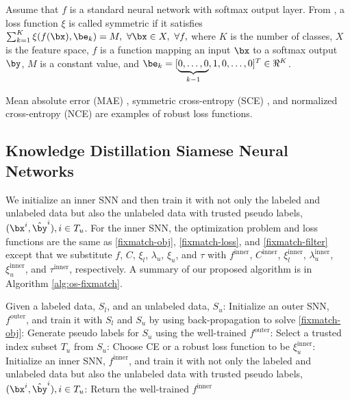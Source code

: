 \documentclass{article}
\begin{document}
Assume that $f$ is a standard neural network with softmax output layer.
From \cite{AG17a}, a loss function $\xi$ is called symmetric if it satisfies
$\sum_{k=1}^K \xi(f(\bx), \be_k) = M,\ \forall \bx \in X,\ \forall f,$
where $K$ is the number of classes, $X$ is the feature space, 
$f$ is a function mapping an input $\bx$ to a softmax output $\by$, $M$ is a constant value, and
$\be_k = [\underbrace{0, \ldots, 0}_{k-1}, 1, 0, \ldots, 0]^T \in \Re^K$.

Mean absolute error (MAE) \cite{CJW85a}, symmetric cross-entropy (SCE) \cite{YW19a}, and normalized cross-entropy (NCE) \cite{XM20a} are examples of robust loss functions.

\subsection{Knowledge Distillation Siamese Neural Networks}
\label{subsec:dual-TS}

We initialize an inner SNN and then train it with not only the labeled and unlabeled data but also the unlabeled data with trusted pseudo labels, $(\bx^i, \hat{\by}^i), i \in T_u$.
For the inner SNN, the optimization problem and loss functions are the same as \eqref{fixmatch-obj}, \eqref{fixmatch-loss}, and \eqref{fixmatch-filter} except that
we substitute $f$, $C$, $\xi_l$, $\lambda_u$, $\xi_u$, and $\tau$  with $f^{\text{inner}}$, $C^{\text{inner}}$, $\xi^{\text{inner}}_l$, $\lambda^{\text{inner}}_u$, $\xi^{\text{inner}}_u$, and $\tau^{\text{inner}}$, respectively.
A summary of our proposed algorithm is in Algorithm \ref{alg:os-fixmatch}.

\setcounter{algocf}{0}
\begin{algorithm}[t]
    Given a labeled data, $S_l$, and an unlabeled data, $S_u$: Initialize an outer SNN, $f^{\text{outer}}$, and train it with $S_l$ and $S_u$ by using back-propagation to
    solve \eqref{fixmatch-obj}: Generate pseudo labels for $S_u$ using the well-trained $f^{\text{outer}}$: Select a trusted index subset $T_u$ from $S_u$: Choose CE or a robust loss function to be $\xi^{\text{inner}}_u$: Initialize an inner SNN, $f^{\text{inner}}$, and train it with not only the labeled and unlabeled data but also the unlabeled data with trusted pseudo labels, $(\bx^i, \hat{\by}^i), i \in T_u$: Return the well-trained $f^{\text{inner}}$\;
    \caption{KD-FixMatch}
\label{alg:os-fixmatch}
\end{algorithm}
\end{document}

